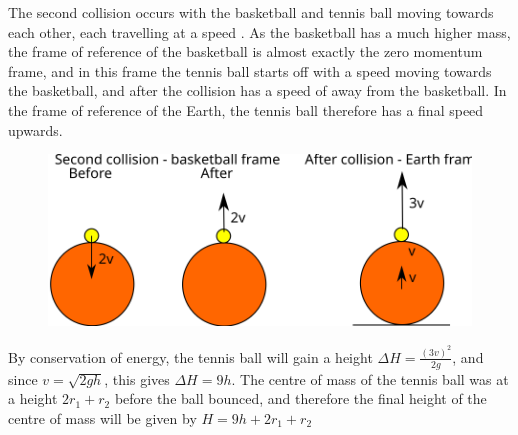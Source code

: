 \begin{problem}[Superball]
{The second collision occurs with the basketball and tennis ball moving towards each other, each travelling at a speed . As the basketball has a much higher mass, the frame of reference of the basketball is almost exactly the zero momentum frame, and in this frame the tennis ball starts off with a speed  moving towards the basketball, and after the collision has a speed of  away from the basketball. In the frame of reference of the Earth, the tennis ball therefore has a final speed  upwards.

\begin{figure}[h]
\centering
\includegraphics[width=1.0\textwidth]{../../../figures/dynamics_tennis_basket_ball_second.svg}
\caption{}\label{fig:dynamics_tennis_basket_second}
\end{figure}


By conservation of energy, the tennis ball will gain a height $\Delta H = \frac{(3v)^2}{2g}$, and since $v = \sqrt{2gh}$, this gives $\Delta H = 9h$. The centre of mass of the tennis ball was at a height $2r_1 + r_2$ before the ball bounced, and therefore the final height of the centre of mass will be given by $H = 9h + 2r_1 + r_2$
}
\end{problem}